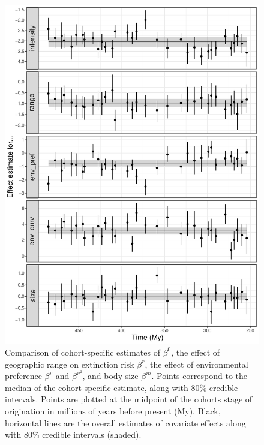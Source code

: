 \documentclass[11pt]{article}
\begin{document}
\begin{figure}[ht]
  \centering
  \includegraphics[width = \textwidth,height = 0.7\textheight,keepaspectratio=true]{figure/cohort_series_cweib_cens}
  \caption{Comparison of cohort-specific estimates of \(\beta^{0}\), the effect of geographic range on extinction risk \(\beta^{r}\), the effect of environmental preference \(\beta^{v}\) and \(\beta^{v^{2}}\), and body size \(\beta^{m}\). Points correspond to the median of the cohort-specific estimate, along with 80\% credible intervals. Points are plotted at the midpoint of the cohorts stage of origination in millions of years before present (My). Black, horizontal lines are the overall estimates of covariate effects along with 80\% credible intervals (shaded).}
  \label{fig:cohort_series}
\end{figure}
\clearpage
\end{document}
